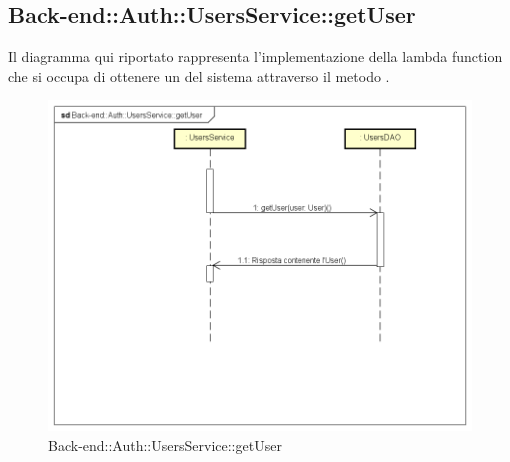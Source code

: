 \subsection{Back-end::Auth::UsersService::getUser} 
Il diagramma qui riportato rappresenta l'implementazione della lambda function che si occupa di ottenere un  del sistema attraverso il metodo .  \begin{figure}[h] \centering \includegraphics[width=\textwidth,height=\textheight,keepaspectratio]{images/diagrams/back-end/Ufficial_Backend/Back-endAuthUsersServicegetUser.png} 	\caption{Back-end::Auth::UsersService::getUser}
\end{figure} 
\newpage

